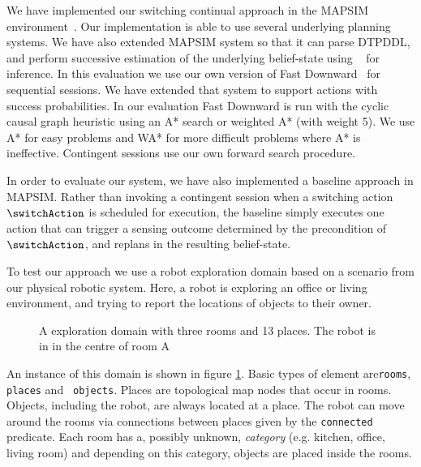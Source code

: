 
We have implemented our switching continual approach in the MAPSIM
environment~\cite{brenner:nebel:jaamas09}. Our implementation is able
to use several underlying planning systems. We have also extended
MAPSIM system so that it can parse DTPDDL, and perform successive
estimation of the underlying belief-state using
~\cite{king:2009} for inference.  In this evaluation
we use our own version of Fast Downward~\cite{fast-downward} for
sequential sessions. We have extended that system to support actions
with success probabilities. In our evaluation Fast Downward is run
with the cyclic causal graph heuristic using an A* search or weighted
A* (with weight 5). We use A* for easy problems and WA* for more
difficult problems where A* is ineffective. Contingent sessions use
our own forward search procedure.



In order to evaluate our system, we have also implemented a baseline
approach in MAPSIM. Rather than invoking a contingent session when a
switching action $\switchAction$ is scheduled for execution, the
baseline simply executes one action that can trigger a sensing outcome
determined by the precondition of $\switchAction$, and replans in the
resulting belief-state.






To test our approach we use a robot exploration domain based on a
scenario from our physical robotic system. Here, a robot is
exploring an office or living environment, and trying to report the
locations of objects to their owner.

\begin{figure}[h]
  \centering
  
  \caption{A exploration domain with three rooms and 13 places. The
    robot is in in the centre of room A}
\label{fig:dora2}
\end{figure}
An instance of this domain is shown in figure \ref{fig:dora2}. Basic
types of element are{\tt rooms}, {\tt places} and {\tt
  objects}. Places are topological map nodes that occur in rooms.
Objects, including the robot, are always located at a place. The robot
can move around the rooms via connections between places given by the
{\tt connected} predicate. Each room has a, possibly unknown, {\em
  category} (e.g. kitchen, office, living room) and depending on this
category, objects are placed inside the rooms.

